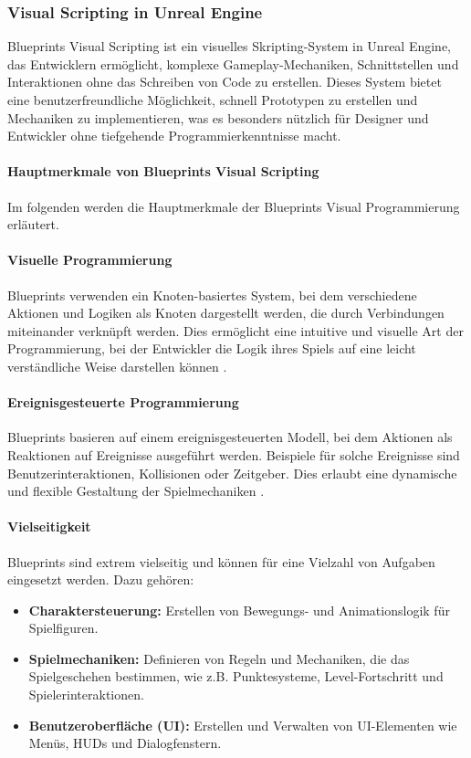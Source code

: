 \subsubsection{Visual Scripting in Unreal Engine}
Blueprints Visual Scripting ist ein visuelles Skripting-System in Unreal Engine, das Entwicklern ermöglicht, komplexe Gameplay-Mechaniken, Schnittstellen und Interaktionen ohne das Schreiben von Code zu erstellen. Dieses System bietet eine benutzerfreundliche Möglichkeit, schnell Prototypen zu erstellen und Mechaniken zu implementieren, was es besonders nützlich für Designer und Entwickler ohne tiefgehende Programmierkenntnisse macht.

\paragraph{Hauptmerkmale von Blueprints Visual Scripting}
Im folgenden werden die Hauptmerkmale der Blueprints Visual Programmierung erläutert. 
\paragraph{Visuelle Programmierung}
Blueprints verwenden ein Knoten-basiertes System, bei dem verschiedene Aktionen und Logiken als Knoten dargestellt werden, die durch Verbindungen miteinander verknüpft werden. Dies ermöglicht eine intuitive und visuelle Art der Programmierung, bei der Entwickler die Logik ihres Spiels auf eine leicht verständliche Weise darstellen können \cite{unrealDocs}.

\paragraph{Ereignisgesteuerte Programmierung}
Blueprints basieren auf einem ereignisgesteuerten Modell, bei dem Aktionen als Reaktionen auf Ereignisse ausgeführt werden. Beispiele für solche Ereignisse sind Benutzerinteraktionen, Kollisionen oder Zeitgeber. Dies erlaubt eine dynamische und flexible Gestaltung der Spielmechaniken \cite{unrealEngine}.

\paragraph{Vielseitigkeit}
Blueprints sind extrem vielseitig und können für eine Vielzahl von Aufgaben eingesetzt werden. Dazu gehören:
\begin{itemize}
    \item \textbf{Charaktersteuerung:} Erstellen von Bewegungs- und Animationslogik für Spielfiguren.
    \item \textbf{Spielmechaniken:} Definieren von Regeln und Mechaniken, die das Spielgeschehen bestimmen, wie z.B. Punktesysteme, Level-Fortschritt und Spielerinteraktionen.
    \item \textbf{Benutzeroberfläche (UI):} Erstellen und Verwalten von UI-Elementen wie Menüs, HUDs und Dialogfenstern.
\end{itemize}

